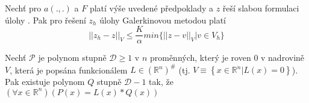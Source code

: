 \documentclass[../main.tex]{subfiles}
\begin{document}
\begin{theorem}[Céova]


    Nechť pro $a(.,.)$ a $F$ platí výše uvedené předpoklady a $z$ řeší slabou formulaci úlohy . Pak pro řešení $z_h$ úlohy Galerkinovou metodou platí 
    \begin{equation}
        ||z_h - z||_V \leq \frac{K}{\alpha} min\{||z - v||_V | v\in V_h \}
    \end{equation} 
    \end{theorem}






        
        
        
        




\begin{lemma}[O redukci]
    Nechť $\mathcal{P}$ je polynom stupně $\mathcal{D} \geq 1$ v $n$ proměnných, který je roven $0$ v nadrovině $V$, která je popsána funkcionálem $L\in(\mathbb{R}^n)^\#$ (tj. $V\equiv \left\{x\in\mathbb{R}^n| L(x)= 0\right\}$).
    Pak existuje polynom $Q$ stupně $\mathcal{D} - 1$ tak, že $(\forall x\in\mathbb{R}^n)(P(x) = L(x)*Q(x))$    
\end{lemma}
\end{document}
